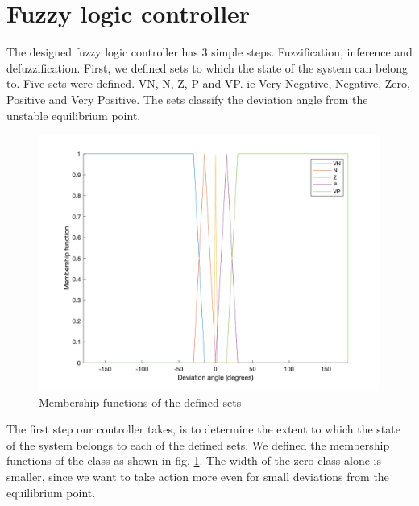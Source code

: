 \section{Fuzzy logic controller}

The designed fuzzy logic controller has 3 simple steps. Fuzzification, inference and defuzzification. First, we defined sets to which the state of the system can belong to. Five sets were defined. VN, N, Z, P and VP. ie Very Negative, Negative, Zero, Positive and Very Positive. The sets classify the deviation angle from the unstable equilibrium point. \\

\begin{figure}[h!]
    \centering
    \includegraphics[scale=0.35]{images/fuzzify.png}
    \caption{ Membership functions of the defined sets }
    \label{fig:fuzzify}
\end{figure}

The first step our controller takes, is to determine the extent to which the state of the system belongs to each of the defined sets. We defined the membership functions of the class as shown in fig. \ref{fig:fuzzify}. The width of the zero class alone is smaller, since we want to take action more even for small deviations from the equilibrium point. \\

